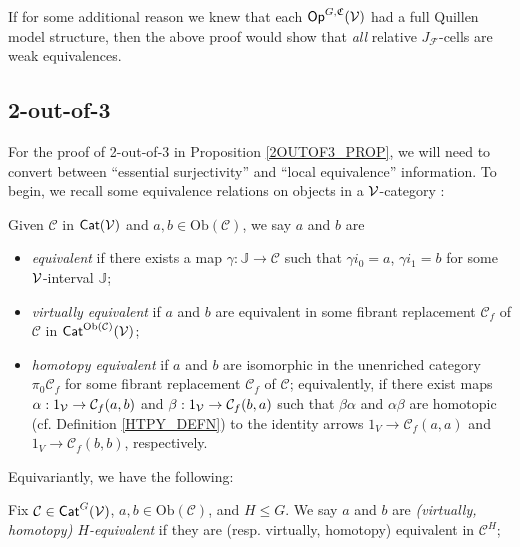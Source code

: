 \documentclass[a4paper,10pt
,draft
]{article}%
\renewcommand{\F}{\mathcal F}
\newcommand{\J}{\mathbb J}
\renewcommand{\1}{\eta}%
\begin{document}
\begin{remark}
      \label{OPGCV_F_JC_REM}
      If for some additional reason we knew that each $\mathsf{Op}^{G, \mathfrak C}(\mathcal V)$ had a full Quillen model structure,
      then the above proof would show that \textit{all} relative $J_\F$-cells are weak equivalences.
\end{remark}




\subsection{2-out-of-3}

For the proof of 2-out-of-3 in Proposition \ref{2OUTOF3_PROP}, we will need to convert between
``essential surjectivity'' and ``local equivalence'' information. 
To begin, we recall some equivalence relations on objects in a $\mathcal V$-category \cite{Cav, BM13}:
\begin{definition}
      Given $\mathcal{C}$ in  $\mathsf{Cat}(\mathcal V)$ and $a,b\in\mathrm{Ob}(\mathcal C)$, we say $a$ and $b$ are
      \begin{itemize}
      \item {\em equivalent} if there exists a map $\gamma: \J \to \mathcal C$ such that
            $\gamma i_0 = a$, $\gamma i_1 = b$
            for some $\mathcal V$-interval $\J$;
      \item {\em virtually equivalent} if $a$ and $b$ are equivalent in some fibrant replacement
            $\mathcal C_f$ of $\mathcal C$ in $\mathsf{Cat}^{\mathrm{Ob}(\mathcal C)}(\mathcal V)$;
      \item {\em homotopy equivalent} if $a$ and $b$ are isomorphic in the unenriched category $\pi_0 \mathcal C_f$
            for some fibrant replacement $\mathcal C_f$ of $\mathcal C$;
            equivalently, if there exist maps
            $\alpha: 1_{\mathcal V} \to \mathcal C_f(a,b)$ and $\beta: 1_{\mathcal V}\to \mathcal C_f(b,a)$ such that
            $\beta\alpha$ and $\alpha\beta$ are homotopic (cf. Definition \ref{HTPY_DEFN})
            to the identity arrows
            $1_V\to \mathcal C_f(a,a)$ and $1_V \to \mathcal C_f(b,b)$, respectively.
      \end{itemize}
\end{definition}

Equivariantly, we have the following:
\begin{definition}
      Fix $\mathcal{C}\in \mathsf{Cat}^G(\mathcal V)$, $a,b\in \mathrm{Ob}(\mathcal{C})$, and $H \leq G$.
      We say $a$ and $b$ are 
      \textit{(virtually, homotopy) $H$-equivalent}
      if they are (resp. virtually, homotopy) equivalent in $\mathcal{C}^H$;
\end{definition}
\end{document}

